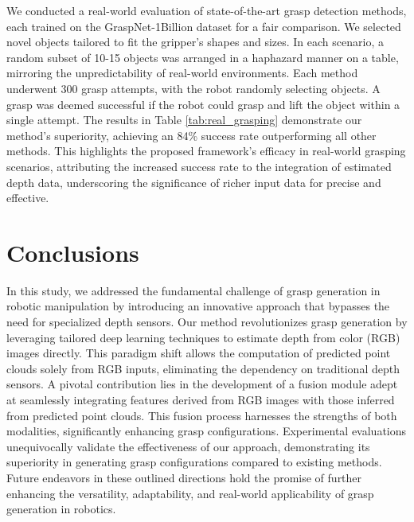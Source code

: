 We conducted a real-world evaluation of state-of-the-art grasp detection methods, each trained on the GraspNet-1Billion dataset for a fair comparison. We selected novel objects tailored to fit the gripper's shapes and sizes. In each scenario, a random subset of 10-15 objects was arranged in a haphazard manner on a table, mirroring the unpredictability of real-world environments. Each method underwent 300 grasp attempts, with the robot randomly selecting objects. A grasp was deemed successful if the robot could grasp and lift the object within a single attempt. The results in Table \ref{tab:real_grasping} demonstrate our method's superiority, achieving an 84\% success rate outperforming all other methods. This highlights the proposed framework's efficacy in real-world grasping scenarios, attributing the increased success rate to the integration of estimated depth data, underscoring the significance of richer input data for precise and effective.  \\

\section{Conclusions}

In this study, we addressed the fundamental challenge of grasp generation in robotic manipulation by introducing an innovative approach that bypasses the need for specialized depth sensors. Our method revolutionizes grasp generation by leveraging tailored deep learning techniques to estimate depth from color (RGB) images directly. This paradigm shift allows the computation of predicted point clouds solely from RGB inputs, eliminating the dependency on traditional depth sensors. A pivotal contribution lies in the development of a fusion module adept at seamlessly integrating features derived from RGB images with those inferred from predicted point clouds. This fusion process harnesses the strengths of both modalities, significantly enhancing grasp configurations. Experimental evaluations unequivocally validate the effectiveness of our approach, demonstrating its superiority in generating grasp configurations compared to existing methods. Future endeavors in these outlined directions hold the promise of further enhancing the versatility, adaptability, and real-world applicability of grasp generation in robotics.